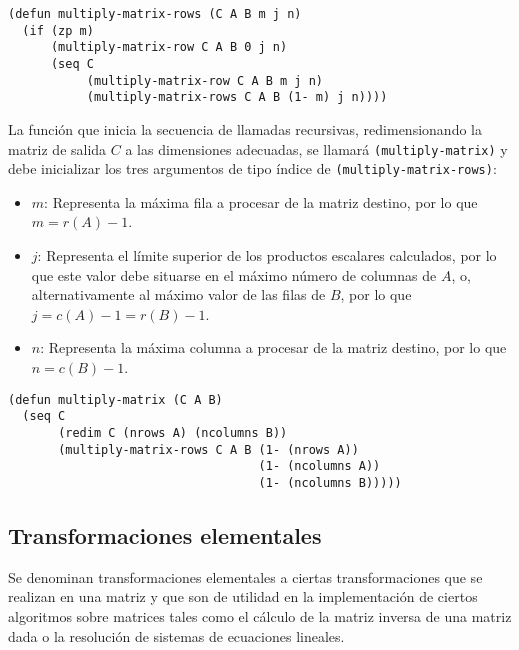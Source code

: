 \documentclass[a4paper,10pt]{article}
\begin{document}
\par \vspace{10pt}

\begin{lstlisting}[language=clips]
(defun multiply-matrix-rows (C A B m j n)
  (if (zp m)
      (multiply-matrix-row C A B 0 j n)
      (seq C
           (multiply-matrix-row C A B m j n)
           (multiply-matrix-rows C A B (1- m) j n))))
\end{lstlisting}

\par \vspace{10pt}

La función que inicia la secuencia de llamadas recursivas, redimensionando la matriz de salida $C$ a las dimensiones adecuadas, se llamará \texttt{(multiply-matrix)} y debe inicializar los tres argumentos de tipo índice de \texttt{(multiply-matrix-rows)}:

\begin{itemize}
	\item $m$: Representa la máxima fila a procesar de la matriz destino, por lo que $m = r(A) - 1$.
	\item $j$: Representa el límite superior de los productos escalares calculados, por lo que este valor debe situarse en el máximo número de columnas de $A$, o, alternativamente al máximo valor de las filas de $B$, por lo que $j = c(A) - 1 = r(B) - 1$.
	\item $n$: Representa la máxima columna a procesar de la matriz destino, por lo que $n = c(B) - 1$. 
\end{itemize}

\par \vspace{10pt}

\begin{lstlisting}[language=clips]
(defun multiply-matrix (C A B)
  (seq C
       (redim C (nrows A) (ncolumns B))
       (multiply-matrix-rows C A B (1- (nrows A)) 
                                   (1- (ncolumns A))
                                   (1- (ncolumns B)))))
\end{lstlisting}

\vspace{12pt}
\subsection{Transformaciones elementales}
\vspace{10pt}

Se denominan transformaciones elementales a ciertas transformaciones que se realizan en una matriz y que son de utilidad en la implementación de ciertos algoritmos sobre matrices tales como el cálculo de la matriz inversa de una matriz dada o la resolución de sistemas de ecuaciones lineales.
\end{document}
